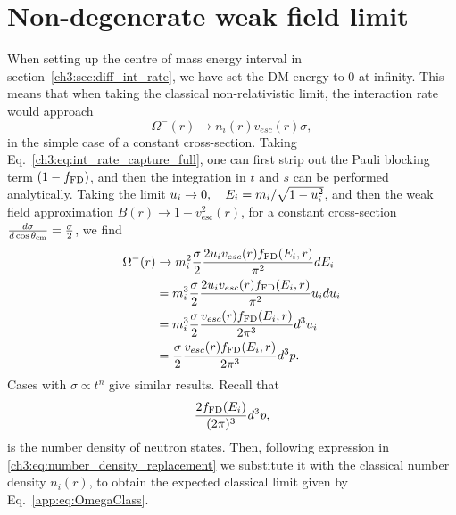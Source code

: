 \section{Non-degenerate weak field limit}
\label{app:sec:weakfieldlimit}


When setting up the centre of mass energy interval in section~\ref{ch3:sec:diff_int_rate}, we have set the DM energy to 0 at infinity. This means that when taking the classical non-relativistic limit, the interaction rate would approach 
\begin{equation}
\Omega^{-}(r) \rightarrow n_i(r) v_{esc}(r) \sigma, \label{app:eq:OmegaClass}
\end{equation}
in the simple case of a constant cross-section. Taking Eq.~\ref{ch3:eq:int_rate_capture_full}, one can first strip out the Pauli blocking term $(1-f_{\rm FD})$, and then the integration in $t$ and $s$ can be performed analytically. Taking the limit $u_i\rightarrow0, \quad E_i=m_i/\sqrt{1-u_i^2}$, and then the weak field approximation $B(r)\rightarrow1-v_\mathrm{esc}^2(r)$, for a constant cross-section $\frac{d\sigma}{d\cos\theta_\mathrm{cm}}=\frac{\sigma}{2}$, we find 
\begin{align}
\Omega^{-}(r) &\rightarrow m_i^2 \frac{\sigma}{2}\frac{2u_i v_{esc}(r) f_{\rm FD}(E_i,r)}{\pi^2}dE_i \\
& = m_i^3 \frac{\sigma}{2} \frac{2u_i v_{esc}(r)  f_{\rm FD}(E_i,r)}{\pi^2}u_i du_i  \\ 
&= m_i^3 \frac{\sigma}{2}\frac{v_{esc}(r)  f_{\rm FD}(E_i,r)}{2\pi^3} d^3u_i \\
& = \frac{\sigma}{2} \frac{v_{esc}(r)  f_{\rm FD}(E_i,r)}{2\pi^3} d^3p. 
\end{align}
Cases with $\sigma\propto t^n$ give similar results.
Recall that
\begin{equation}
    \frac{2f_{\rm FD}(E_i)}{(2\pi)^3} d^3p,
\end{equation}
is the number density of neutron states. Then, following expression in \ref{ch3:eq:number_density_replacement} we substitute it with the classical number density $n_i(r)$, to obtain the expected classical limit given by Eq.~\ref{app:eq:OmegaClass}. 




